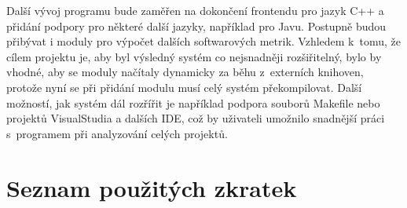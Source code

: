 \documentclass[11pt,twoside,a4paper]{book}
\begin{document}
Další vývoj programu bude zaměřen na dokončení frontendu pro jazyk C++ a přidání podpory pro některé další jazyky, například pro Javu.
Postupně budou přibývat i moduly pro výpočet dalších softwarových metrik. Vzhledem k~tomu, že cílem projektu je, aby byl výsledný systém
co nejsnadněji rozšiřitelný, bylo by vhodné, aby se moduly načítaly dynamicky za běhu z~externích knihoven, protože nyní se při přidání
modulu musí celý systém překompilovat. Další možností, jak systém dál rozřířit je například podpora souborů Makefile nebo projektů VisualStudia
a dalších IDE, což by uživateli umožnilo snadnější práci s~programem při analyzování celých projektů.



%
{
\def\CS{$\cal C\kern-0.1667em\lower.5ex\hbox{$\cal S$}\kern-0.075em $}

}


\chapter{Seznam použitých zkratek}
\end{document}
